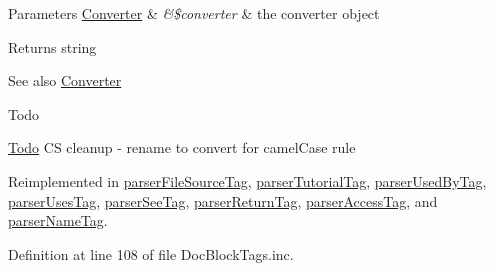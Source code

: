 \begin{DoxyParams}[1]{\-Parameters}
\hyperlink{class_converter}{\-Converter} & {\em \&\$converter} & the converter object\\
\hline
\end{DoxyParams}
\begin{DoxyReturn}{\-Returns}
string 
\end{DoxyReturn}
\begin{DoxySeeAlso}{\-See also}
\hyperlink{class_converter}{\-Converter} 
\end{DoxySeeAlso}
\begin{DoxyRefDesc}{\-Todo}
\item[\hyperlink{todo__todo000061}{\-Todo}]\-C\-S cleanup -\/ rename to convert for camel\-Case rule \end{DoxyRefDesc}


\-Reimplemented in \hyperlink{classparser_file_source_tag_ad6c06bea9d11cc1c362b592306cfa707}{parser\-File\-Source\-Tag}, \hyperlink{classparser_tutorial_tag_a31e57fd66b58b300f8a489aa1b9431f6}{parser\-Tutorial\-Tag}, \hyperlink{classparser_used_by_tag_ad6c06bea9d11cc1c362b592306cfa707}{parser\-Used\-By\-Tag}, \hyperlink{classparser_uses_tag_ad6c06bea9d11cc1c362b592306cfa707}{parser\-Uses\-Tag}, \hyperlink{classparser_see_tag_a31e57fd66b58b300f8a489aa1b9431f6}{parser\-See\-Tag}, \hyperlink{classparser_return_tag_a31e57fd66b58b300f8a489aa1b9431f6}{parser\-Return\-Tag}, \hyperlink{classparser_access_tag_a31e57fd66b58b300f8a489aa1b9431f6}{parser\-Access\-Tag}, and \hyperlink{classparser_name_tag_ad6c06bea9d11cc1c362b592306cfa707}{parser\-Name\-Tag}.



\-Definition at line 108 of file \-Doc\-Block\-Tags.\-inc.



